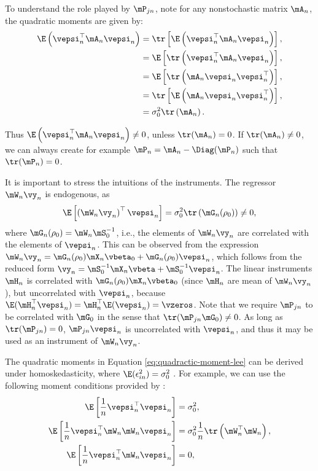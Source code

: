 \documentclass[english,12pt]{book}\usepackage[]{graphicx}\usepackage[]{xcolor}
\begin{document}
To understand the role played by $\mP_{jn}$, note for any nonstochastic matrix $\mA_{n}$, the quadratic moments are given by:
\begin{equation*}
\begin{aligned}
 \E\left(\vepsi_n^\top \mA_n\vepsi_n\right)& = \tr\left[\E\left(\vepsi_n^\top \mA_n\vepsi_n\right)\right], \\
 & = \E\left[\tr\left(\vepsi_n^\top \mA_n\vepsi_n\right)\right], \\
 & = \E\left[\tr\left(\mA_n\vepsi_n\vepsi_n^\top\right)\right], \\
  & = \tr\left[\E\left(\mA_n\vepsi_n\vepsi_n^\top\right)\right], \\
 & = \sigma_0^2\tr\left(\mA_n\right). 
\end{aligned}
\end{equation*}

Thus $\E\left(\vepsi_n^\top \mA_n\vepsi_n\right)\neq 0$, unless $\tr(\mA_n) = 0$. If $\tr(\mA_n) \neq 0$, we can always create for example $\mP_n = \mA_n - \Diag(\mP_n)$ such that $\tr(\mP_n) = 0$. 

It is important to stress the intuitions of the instruments. The regressor $\mW_n\vy_n$ is endogenous, as
\begin{equation*}
\E\left[\left(\mW_n\vy_n\right)^\top \vepsi_n\right] = \sigma_0^2\tr\left(\mG_n(\rho_0)\right) \neq 0, 
\end{equation*}
%
where $\mG_n(\rho_0) = \mW_n\mS_0^{-1}$, i.e., the elements of $\mW_n\vy_n$ are correlated with the elements of $\vepsi_n$. This can be observed from the expression $\mW_n\vy_n = \mG_n(\rho_0)\mX_n\vbeta_0 + \mG_n(\rho_0)\vepsi_n$, which follows from the reduced form $\vy_n = \mS_0^{-1}\mX_n\vbeta + \mS_0^{-1}\vepsi_n$. The linear instruments $\mH_n$ is correlated with $\mG_n(\rho_0)\mX_n\vbeta_0$ (since $\mH_n$ are mean of $\mW_n\vy_n$),  but uncorrelated with $\vepsi_n$, because $\E(\mH_n^\top\vepsi_n) = \mH_n^\top\E(\vepsi_n) = \vzeros$. Note that we require $\mP_{jn}$ to be correlated with $\mG_0$ in the sense that $\tr(\mP_{jn}\mG_0)\neq 0$. As long as $\tr(\mP_{jn}) = 0$, $\mP_{jn}\vepsi_n$ is uncorrelated with $\vepsi_n$, and thus it may be used as an instrument of $\mW_n\vy_n$. 

The quadratic moments in Equation \eqref{eq:quadractic-moment-lee} can be derived under homoskedasticity, where $\E(\epsilon_{in}^2) = \sigma_0^2$ \citep{lee2001generalized}. For example, we can use the following moment conditions provided by \cite{kelejian1999generalized}:
\begin{equation}\label{eq:moments-kp-1999}
  \begin{aligned}
  \E\left[\frac{1}{n}\vepsi_n^\top \vepsi_n\right]           & = \sigma^2_0, \\
   \E\left[\frac{1}{n}\vepsi_n^\top\mW_n\mW_n\vepsi_n\right] & = \sigma^2_0\frac{1}{n}\tr\left(\mW_n^\top\mW_n\right), \\
   \E\left[\frac{1}{n}\vepsi_n^\top \mW_n \vepsi_n\right]    & =  0,
   \end{aligned}
\end{equation}
\end{document}
